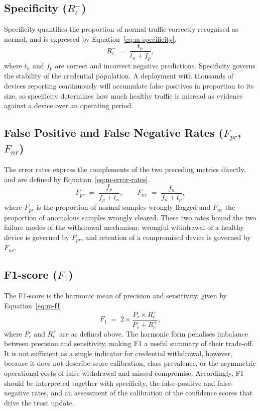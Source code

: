\subsection{Specificity ($R_c^{-}$)}
\label{sec:metric-specificity}

Specificity quantifies the proportion of normal traffic correctly recognised as normal, and is expressed by Equation~\eqref{eq:m-specificity}.
\begin{equation}
\label{eq:m-specificity}
R_c^{-} \;=\; \frac{t_n}{t_n + f_p} ,
\end{equation}
where $t_n$ and $f_p$ are correct and incorrect negative predictions. Specificity governs the stability of the credential population. A deployment with thousands of devices reporting continuously will accumulate false positives in proportion to its size, so specificity determines how much healthy traffic is misread as evidence against a device over an operating period.

\subsection{False Positive and False Negative Rates ($F_{pr}$, $F_{nr}$)}
\label{sec:metric-error-rates}

The error rates express the complements of the two preceding metrics directly, and are defined by Equation~\eqref{eq:m-error-rates}.
\begin{equation}
\label{eq:m-error-rates}
F_{pr} \;=\; \frac{f_p}{f_p + t_n} , \qquad
F_{nr} \;=\; \frac{f_n}{f_n + t_p} ,
\end{equation}
where $F_{pr}$ is the proportion of normal samples wrongly flagged and $F_{nr}$ the proportion of anomalous samples wrongly cleared. These two rates bound the two failure modes of the withdrawal mechanism: wrongful withdrawal of a healthy device is governed by $F_{pr}$, and retention of a compromised device is governed by $F_{nr}$.

\subsection{F1-score ($F_1$)}
\label{sec:metric-f1}

The F1-score is the harmonic mean of precision and sensitivity, given by Equation~\eqref{eq:m-f1}.
\begin{equation}
\label{eq:m-f1}
F_1 \;=\; 2 \times \frac{P_r \times R_c^{+}}{P_r + R_c^{+}} ,
\end{equation}
where $P_r$ and $R_c^{+}$ are as defined above. The harmonic form penalises
imbalance between precision and sensitivity, making F1 a useful summary of their
trade-off. It is not sufficient as a single indicator for credential withdrawal,
however, because it does not describe score calibration, class prevalence, or
the asymmetric operational costs of false withdrawal and missed compromise.
Accordingly, F1 should be interpreted together with specificity, the
false-positive and false-negative rates, and an assessment of the calibration of
the confidence scores that drive the trust update.

